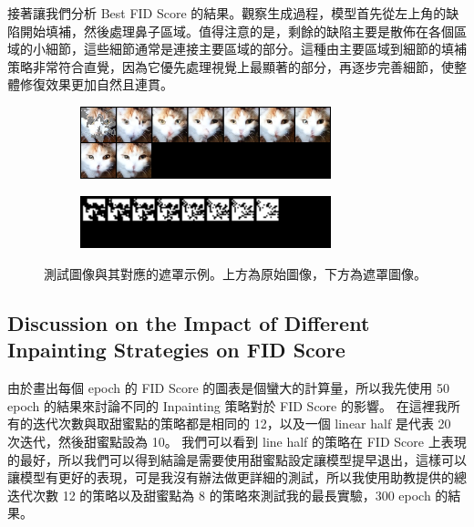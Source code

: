 接著讓我們分析 Best FID Score 的結果。觀察生成過程，模型首先從左上角的缺陷開始填補，然後處理鼻子區域。值得注意的是，剩餘的缺陷主要是散佈在各個區域的小細節，這些細節通常是連接主要區域的部分。這種由主要區域到細節的填補策略非常符合直覺，因為它優先處理視覺上最顯著的部分，再逐步完善細節，使整體修復效果更加自然且連貫。

\begin{figure}[h]
    \centering
    \begin{subfigure}{\textwidth}
        \centering
        \includegraphics[width=0.8\textwidth]{figures/test_69.png}
        \label{fig:test_69}
    \end{subfigure}
    \vspace{1cm}
    \begin{subfigure}{\textwidth}
        \centering
        \includegraphics[width=0.8\textwidth]{figures/mask_test_69.png}
        \label{fig:mask_test_69}
    \end{subfigure}
    \caption{測試圖像與其對應的遮罩示例。上方為原始圖像，下方為遮罩圖像。}
    \label{fig:test_and_mask}
\end{figure}






\clearpage
\subsection{Discussion on the Impact of Different Inpainting Strategies on FID Score}

由於畫出每個 epoch 的 FID Score 的圖表是個蠻大的計算量，所以我先使用 50 epoch 的結果來討論不同的 Inpainting 策略對於 FID Score 的影響。 在這裡我所有的迭代次數與取甜蜜點的策略都是相同的 12，以及一個 linear half 是代表 20 次迭代，然後甜蜜點設為 10。
我們可以看到 line half 的策略在 FID Score 上表現的最好，所以我們可以得到結論是需要使用甜蜜點設定讓模型提早退出，這樣可以讓模型有更好的表現，可是我沒有辦法做更詳細的測試，所以我使用助教提供的總迭代次數 12 的策略以及甜蜜點為 8 的策略來測試我的最長實驗，300 epoch 的結果。


